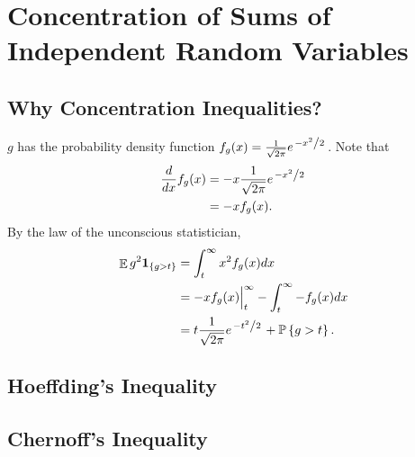 \documentclass{report}
\theoremstyle{definition}
\newenvironment{exercise}[1]{
  \renewcommand\theexerciseimpl{#1}
  \exerciseimpl
}{\endexerciseimpl}
\newcommand{\slfrac}[2]{\left.#1\middle/#2\right.}
\DeclareMathOperator{\E}{\mathbb{E}}
\renewcommand{\P}[1]{\mathbb{P}\left\{#1\right\}}
\newcommand{\ind}[1]{\mathbf{1}_{\left\{#1\right\}}}
\begin{document}
\chapter{Concentration of Sums of Independent Random Variables}

\section{Why Concentration Inequalities?}

\begin{exercise}{2.1.4}
  $g$ has the probability density function $f_g(x) = \frac{1}{\sqrt{2 \pi}} e^{\slfrac{-x^2}{2}}$.
  Note that
  \begin{align*}
    \frac{d}{dx} f_g(x) & = -x \frac{1}{\sqrt{2 \pi}} e^{\slfrac{-x^2}{2}} \\
    & = -x f_g(x).
  \end{align*}
  By the law of the unconscious statistician,
  \begin{align*}
    \E g^2 \ind{g > t} & = \int_t^\infty x^2 f_g(x) dx \\
    & = -x f_g(x) \Big|_t^\infty - \int_t^\infty -f_g(x) dx \\
    & = t \frac{1}{\sqrt{2 \pi}} e^{\slfrac{-t^2}{2}} + \P{g > t}.
  \end{align*}
\end{exercise}

\section{Hoeffding's Inequality}

\begin{exercise}{2.2.3}
\end{exercise}

\begin{exercise}{2.2.7}
\end{exercise}

\begin{exercise}{2.2.8}
\end{exercise}

\begin{exercise}{2.2.9}
\end{exercise}

\begin{exercise}{2.2.10}
\end{exercise}

\section{Chernoff's Inequality}
\end{document}
